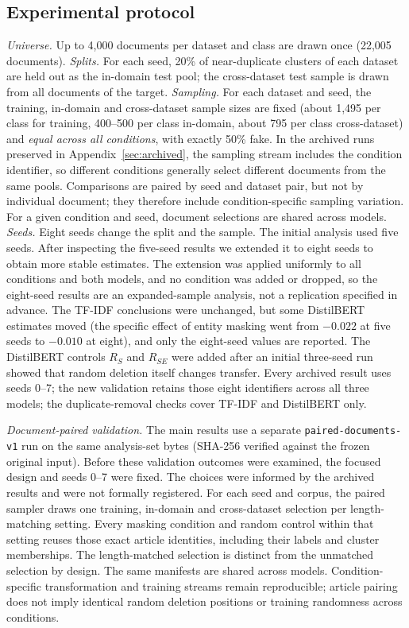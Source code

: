 \subsection{Experimental protocol}
\emph{Universe.} Up to 4,000 documents per dataset and class are drawn once (22,005 documents). \emph{Splits.} For each seed, 20\% of near-duplicate clusters of each dataset are held out as the in-domain test pool; the cross-dataset test sample is drawn from all documents of the target. \emph{Sampling.} For each dataset and seed, the training, in-domain and cross-dataset sample sizes are fixed (about 1,495 per class for training, 400--500 per class in-domain, about 795 per class cross-dataset) and \emph{equal across all conditions}, with exactly 50\% fake. In the archived runs preserved in Appendix~\ref{sec:archived}, the sampling stream includes the condition identifier, so different conditions generally select different documents from the same pools. Comparisons are paired by seed and dataset pair, but not by individual document; they therefore include condition-specific sampling variation. For a given condition and seed, document selections are shared across models. \emph{Seeds.} Eight seeds change the split and the sample. The initial analysis used five seeds. After inspecting the five-seed results we extended it to eight seeds to obtain more stable estimates. The extension was applied uniformly to all conditions and both models, and no condition was added or dropped, so the eight-seed results are an expanded-sample analysis, not a replication specified in advance. The TF-IDF conclusions were unchanged, but some DistilBERT estimates moved (the specific effect of entity masking went from $-0.022$  at five seeds to $-0.010$  at eight), and only the eight-seed values are reported. The DistilBERT controls $R_S$ and $R_{SE}$ were added after an initial three-seed run showed that random deletion itself changes transfer. Every archived result uses seeds 0--7; the new validation retains those eight identifiers across all three models; the duplicate-removal checks cover TF-IDF and DistilBERT only.

\emph{Document-paired validation.} The main results use a separate \texttt{paired-documents-v1} run on the same analysis-set bytes (SHA-256 verified against the frozen original input). Before these validation outcomes were examined, the focused design and seeds 0--7 were fixed. The choices were informed by the archived results and were not formally registered. For each seed and corpus, the paired sampler draws one training, in-domain and cross-dataset selection per length-matching setting. Every masking condition and random control within that setting reuses those exact article identities, including their labels and cluster memberships. The length-matched selection is distinct from the unmatched selection by design. The same manifests are shared across models. Condition-specific transformation and training streams remain reproducible; article pairing does not imply identical random deletion positions or training randomness across conditions.

